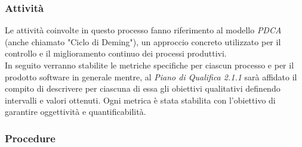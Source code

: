 \subsubsection{Attività}
Le attività coinvolte in questo processo fanno riferimento al modello \textit{PDCA\glo} (anche chiamato "Ciclo di Deming"), un approccio concreto utilizzato per il controllo e il miglioramento continuo dei processi produttivi.\\
In seguito verranno stabilite le metriche specifiche per ciascun processo e per il prodotto software in generale mentre, al \textit{Piano di Qualifica 2.1.1\doc} sarà affidato il compito di descrivere per ciascuna di essa gli obiettivi qualitativi definendo intervalli e valori ottenuti. Ogni metrica è stata stabilita con l'obiettivo di garantire oggettività e quantificabilità.



\subsubsection{Procedure}
